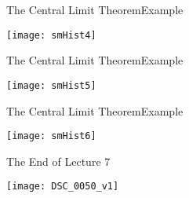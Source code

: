 \documentclass[xcolor=dvipsnames]{beamer}
\begin{document}
\begin{frame}{The Central Limit Theorem}{Example}
	\begin{center}
		\texttt{[image: smHist4]}
	\end{center}
\end{frame}

\begin{frame}{The Central Limit Theorem}{Example}
	\begin{center}
		\texttt{[image: smHist5]}
	\end{center}
\end{frame}

\begin{frame}{The Central Limit Theorem}{Example}
	\begin{center}
		\texttt{[image: smHist6]}
	\end{center}
\end{frame}

\begin{frame}{The End of Lecture 7}
	\begin{center}
		\texttt{[image: DSC\_0050\_v1]}
	\end{center}
\end{frame}
\end{document}
